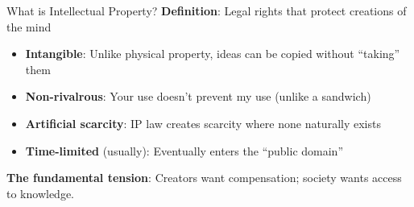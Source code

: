 \documentclass[aspectratio=169]{beamer}
\begin{document}
\begin{frame}{What is Intellectual Property?}
\textbf{Definition}: Legal rights that protect creations of the mind

\vspace{0.2cm}
\begin{itemize}
    \item \textbf{Intangible}: Unlike physical property, ideas can be copied without ``taking'' them
    \item \textbf{Non-rivalrous}: Your use doesn't prevent my use (unlike a sandwich)
    \item \textbf{Artificial scarcity}: IP law creates scarcity where none naturally exists
    \item \textbf{Time-limited} (usually): Eventually enters the ``public domain''
\end{itemize}

\vspace{0.3cm}
\begin{center}
\end{center}

\vspace{0.2cm}
\textbf{The fundamental tension}: Creators want compensation; society wants access to knowledge.
\end{frame}
\end{document}
